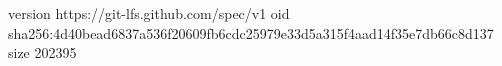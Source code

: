 version https://git-lfs.github.com/spec/v1
oid sha256:4d40bead6837a536f20609fb6cdc25979e33d5a315f4aad14f35e7db66c8d137
size 202395
